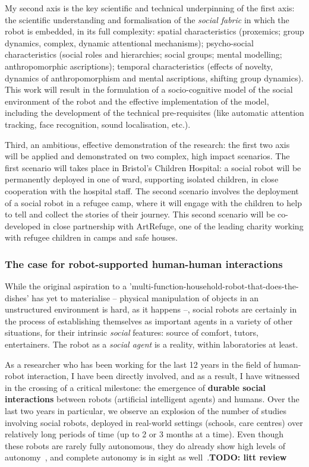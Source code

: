 \documentclass[11pt]{article}
\newcommand{\TODO}[1]{{\color{red}\textbf{TODO: #1}}}
\begin{document}
My second axis is the key scientific and technical underpinning of the first
axis:  the scientific understanding and formalisation of the \emph{social
fabric} in which the robot is embedded, in its full complexity: spatial
characteristics (proxemics; group dynamics, complex, dynamic attentional
mechanisms); psycho-social characteristics (social roles and hierarchies; social
groups; mental modelling; anthropomorphic ascriptions); temporal characteristics
(effects of novelty, dynamics of anthropomorphism and mental ascriptions,
shifting group dynamics). This work will result in the formulation of a
socio-cognitive model of the social environment of the robot and the effective
implementation of the model, including the development of the technical
pre-requisites (like automatic attention tracking, face recognition, sound
localisation, etc.).

Third, an ambitious, effective demonstration of the research: the first two axis
will be applied and demonstrated on two complex, high impact scenarios. The
first scenario will takes place in Bristol's Children Hospital: a social robot
will be permanently deployed in one of ward, supporting isolated children, in
close cooperation with the hospital staff. The second scenario involves the
deployment of a social robot in a refugee camp, where it will engage with the
children to help to tell and collect the stories of their journey. This second
scenario will be co-developed in close partnership with ArtRefuge, one of the
leading charity working with refugee children in camps and safe houses.

\subsubsection{The case for robot-supported human-human interactions}

While the original aspiration to a
'multi-function-household-robot-that-does-the-dishes' has yet to materialise --
physical manipulation of objects in an unstructured environment is hard, as it
happens --, social robots are certainly in the process of establishing
themselves as important agents in a variety of other situations, for their
intrinsic \emph{social} features: source of comfort, tutors, entertainers. The
robot as a \emph{social agent} is a reality, within laboratories at least.

As a researcher who has been working for the last 12 years in the field of
human-robot interaction, I have been directly involved, and as a result, I have
witnessed in the crossing of a critical milestone: the emergence of
\textbf{durable social interactions} between robots (artificial intelligent
agents) and humans. Over the last two years in particular, we observe an
explosion of the number of studies involving social robots, deployed in
real-world settings (schools, care centres) over relatively long periods of time
(up to 2 or 3 months at a time). Even though these robots are rarely fully
autonomous, they do already show high levels of autonomy~\cite{emmanuel}, and complete autonomy
is in sight as well~\cite{strands}.\TODO{litt review}
\end{document}
